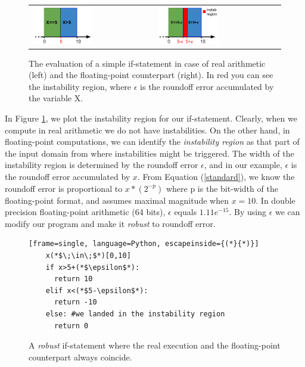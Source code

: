 \begin{figure}[tb!]
	\centering
	\begin{tabular}{ll}
		\includegraphics[width=0.5\textwidth]{pic/ifreal.png}
		&
		\includegraphics[width=0.5\textwidth]{pic/iffp.png}
	\end{tabular}
	\caption{The evaluation of a simple if-statement in case of real arithmetic (left) and the floating-point counterpart (right). In red you can see the instability region, where $\epsilon$ is the roundoff error accumulated by the variable X.}
	\label{fig:ifreal}
\end{figure}

In Figure \ref{fig:ifreal}, we plot the instability region for our if-statement. Clearly, when we compute in real arithmetic we do not have instabilities. On the other hand, in floating-point computations, we can identify the \emph{instability region} as that part of the input domain from where instabilities might be triggered.
%
The width of the instability region is determined by the roundoff error $\epsilon$, and in our example, $\epsilon$ is the roundoff error accumulated by $x$. From Equation (\ref{standard}), we know the roundoff error is proportional to $x*(2^{-p})$ where p is the bit-width of the floating-point format, and assumes maximal magnitude when $x=10$.  
%
In double precision floating-point arithmetic (64 bits), $\epsilon$ equals $1.11e^{-15}$.
%
By using $\epsilon$ we can modify our program and make it \emph{robust} to roundoff error.
%
\begin{figure}[tb!]
	\begin{lstlisting}[frame=single, language=Python, escapeinside={(*}{*)}]
	x(*$\;\in\;$*)[0,10]
	if x>5+(*$\epsilon$*):
	  return 10
	elif x<(*$5-\epsilon$*):
	  return -10
	else: #we landed in the instability region
	  return 0
	\end{lstlisting}
	\caption{A \emph{robust} if-statement where the real execution and the floating-point counterpart always coincide.}\label{fig:ifrobust}
\end{figure}
%

